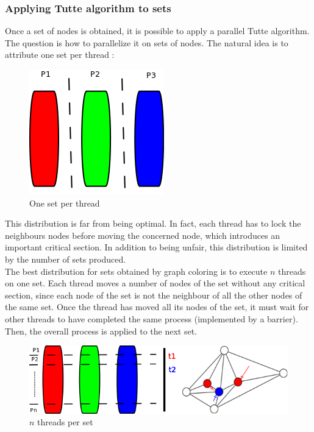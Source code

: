 \subsubsection{Applying Tutte algorithm to sets}
Once a set of nodes is obtained, it is possible to apply a parallel Tutte algorithm. The question is how to parallelize it on sets of nodes. The natural idea is to attribute one set per thread :
\begin{figure}[!h]
\centering
\includegraphics[scale=0.5]{img/distribution_verticale.png}
\caption{One set per thread}
\end{figure}
This distribution is far from being optimal. In fact, each thread has to lock the neighbours nodes before moving the concerned node, which introduces an important critical section. In addition to being unfair, this distribution is limited by the number of sets produced.\\

The best distribution for sets obtained by graph coloring is to execute $n$ threads on one set. Each thread moves a number of nodes of the set without any critical section, since each node of the set is not the neighbour of all the other nodes of the same set. Once the thread has moved all its nodes of the set, it must wait for other threads to have completed the same process (implemented by a barrier). Then, the overall process is applied to the next set.

\begin{figure}[!h]
\centering
\includegraphics[scale=0.5]{img/distrib.png}
\caption{$n$ threads per set}
\end{figure}



